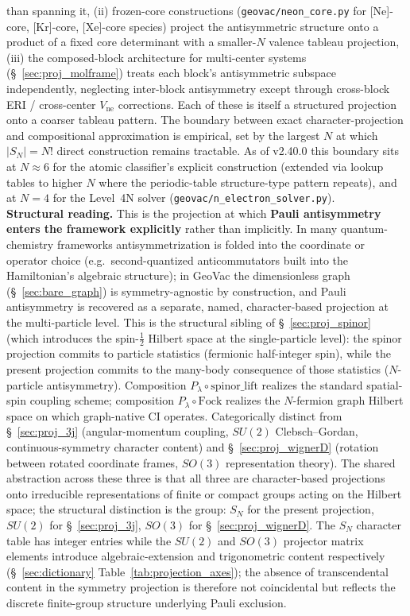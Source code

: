 than spanning it, (ii) frozen-core constructions
(\texttt{geovac/neon\_core.py} for [Ne]-core, [Kr]-core, [Xe]-core
species) project the antisymmetric structure onto a product of a
fixed core determinant with a smaller-$N$ valence tableau projection,
(iii) the composed-block architecture for multi-center systems
(\S~\ref{sec:proj_molframe}) treats each block's antisymmetric
subspace independently, neglecting inter-block antisymmetry except
through cross-block ERI / cross-center $V_\text{ne}$ corrections.
Each of these is itself a structured projection onto a coarser
tableau pattern.  The boundary between exact character-projection
and compositional approximation is empirical, set by the largest $N$
at which $|S_N| = N!$ direct construction remains tractable.  As of
v2.40.0 this boundary sits at $N \approx 6$ for the atomic
classifier's explicit construction (extended via lookup tables to
higher $N$ where the periodic-table structure-type pattern repeats),
and at $N = 4$ for the Level~4N solver
(\texttt{geovac/n\_electron\_solver.py}).\\
\textbf{Structural reading.}  This is the projection at which
\textbf{Pauli antisymmetry enters the framework explicitly} rather
than implicitly.  In many quantum-chemistry frameworks
antisymmetrization is folded into the coordinate or operator choice
(e.g.\ second-quantized anticommutators built into the Hamiltonian's
algebraic structure); in GeoVac the dimensionless graph
(\S~\ref{sec:bare_graph}) is symmetry-agnostic by construction, and
Pauli antisymmetry is recovered as a separate, named, character-based
projection at the multi-particle level.  This is the structural
sibling of \S~\ref{sec:proj_spinor} (which introduces the
spin-$\tfrac{1}{2}$ Hilbert space at the single-particle level): the
spinor projection commits to particle statistics (fermionic
half-integer spin), while the present projection commits to the
many-body consequence of those statistics ($N$-particle
antisymmetry).  Composition $P_\lambda \circ
\text{spinor\_lift}$ realizes the standard spatial-spin coupling
scheme; composition $P_\lambda \circ \text{Fock}$ realizes the
$N$-fermion graph Hilbert space on which graph-native CI operates.
Categorically distinct from \S~\ref{sec:proj_3j} (angular-momentum
coupling, $SU(2)$ Clebsch--Gordan, continuous-symmetry character
content) and \S~\ref{sec:proj_wignerD} (rotation between rotated
coordinate frames, $SO(3)$ representation theory).  The shared
abstraction across these three is that all three are character-based
projections onto irreducible representations of finite or compact
groups acting on the Hilbert space; the structural distinction is
the group: $S_N$ for the present projection, $SU(2)$ for
\S~\ref{sec:proj_3j}, $SO(3)$ for \S~\ref{sec:proj_wignerD}.  The
$S_N$ character table has integer entries while the $SU(2)$ and
$SO(3)$ projector matrix elements introduce algebraic-extension and
trigonometric content respectively (\S~\ref{sec:dictionary}
Table~\ref{tab:projection_axes}); the absence of transcendental
content in the symmetry projection is therefore not coincidental
but reflects the discrete finite-group structure underlying Pauli
exclusion.
